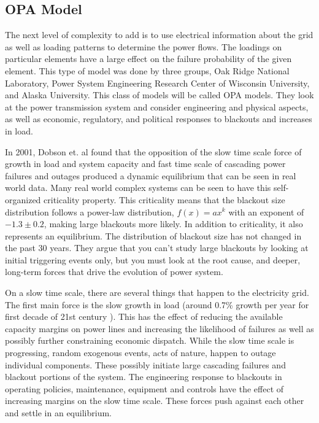 \subsection{OPA Model}

The next level of complexity to add is to use electrical information about the grid as well as loading patterns to determine the power flows.  The loadings on particular elements have a large effect on the failure probability of the given element.  This type of model was done by three groups, Oak Ridge National Laboratory, Power System Engineering Research Center of Wisconsin University, and Alaska University.  This class of models will be called OPA models.  They look at the power transmission system and consider engineering and physical aspects, as well as economic, regulatory, and political responses to blackouts and increases in load.

In 2001, Dobson et. al \cite{dobson_2001} found that the opposition of the slow time scale force of growth in load and system capacity and fast time scale of cascading power failures and outages produced a dynamic equilibrium that can be seen in real world data.  Many real world complex systems can be seen to have this self-organized criticality property.  This criticality means that the blackout size distribution follows a power-law distribution, $f(x) = ax^k$ with an exponent of $-1.3 \pm 0.2$,  making large blackouts more likely.  In addition to criticality, it also represents an equilibrium.  The distribution of blackout size has not changed in the past 30 years.  They argue that you can't study large blackouts by looking at initial triggering events only, but you must look at the root cause, and deeper, long-term forces that drive the evolution of power system.

On a slow time scale, there are several things that happen to the electricity grid.  The first main force is the slow growth in load (around 0.7\% growth per year for first decade of 21st century \cite{eia_gov}).  This has the effect of reducing the available capacity margins on power lines and increasing the likelihood of failures as well as possibly further constraining economic dispatch.  While the slow time scale is progressing, random exogenous events, acts of nature, happen to outage individual components.  These possibly initiate large cascading failures and blackout portions of the system.  The engineering response to blackouts in operating policies, maintenance, equipment and controls have the effect of increasing margins on the slow time scale.  These forces push against each other and settle in an equilibrium.

